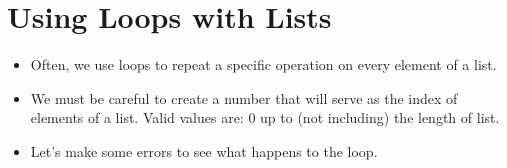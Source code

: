 \documentclass[letterpaper,10pt,english]{sphinxmanual}
\begin{document}
\section{Using Loops with Lists}
\label{\detokenize{lecture_notes/lec09_loops1_while:using-loops-with-lists}}\begin{itemize}
\item {} 
Often, we use loops to repeat a specific operation on every element of
a list.

\item {} 
We must be careful to create a number that will serve as the index
of elements of a list. Valid values are: 0 up to (not including)
the length of list.

%
\begin{sphinxVerbatim}[commandchars=\\\{\}]
  \PYG{p}{[}      \PYGZbs{}
                    \PYGZbs{}
                    \PYGZbs{}
                 \PYG{p}{]}

  
      \PYG{p}{[}\PYG{p}{]}\PYG{p}{[}\PYG{p}{]} \PYGZbs{}
            \PYG{p}{[}\PYG{p}{]}\PYG{p}{[}\PYG{p}{]}
      
\end{sphinxVerbatim}

\item {} 
Let’s make some errors to see what happens to the loop.

\end{itemize}
\end{document}
